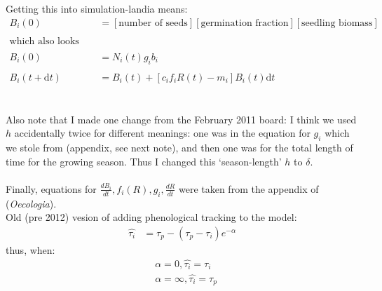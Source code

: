 \documentclass[11pt,a4paper,oneside]{article}
\begin{document}
\noindent Getting this into simulation-landia means:
\begin{align*}
B_{i}(0) & = [\text{number of seeds}][\text{germination
  fraction}][\text{seedling biomass}]
\\
\\
\text{which also looks like:}
\\
\\
B_{i}(0) & = N_{i}(t) g_{i}b_{i}
\\
\\
B_{i}(t+\mathrm{d}t) & =B_{i}(t)+[c_{i}f_{i}R(t)-m_{i}]B_{i}(t)\mathrm{d}t
\end{align*}
\\
\\
\noindent Also note that I made one change from the February 2011 board: I think we
used \(h\) accidentally twice for different meanings: one was in the
equation for \(g_{i}\) which we stole from \cite{Chesson:2004eo}
(appendix, see next note), and then one was for the total length of time for the
growing season. Thus I changed this `season-length' \(h\) to
\(\delta\).
\\
\\
\noindent Finally, equations for \(\frac{dB_{i}}{dt}, f_{i}(R), g_{i},
\frac{dR}{dt}\) were taken from the appendix of \cite{Chesson:2004eo} (\emph{Oecologia}).\\

\noindent Old (pre 2012) vesion of adding phenological tracking to the model:
\begin{align*}
\hat{\tau_{i}} & = \tau_{p}-(\tau_{p}-\tau_{i})e^{-\alpha}
\end{align*}
\noindent thus, when:
\begin{align*}
& \alpha=0, \hat{\tau_{i}}=\tau_{i}
\\
& \alpha=\infty, \hat{\tau_{i}}=\tau_{p}
\end{align*}
\end{document}
